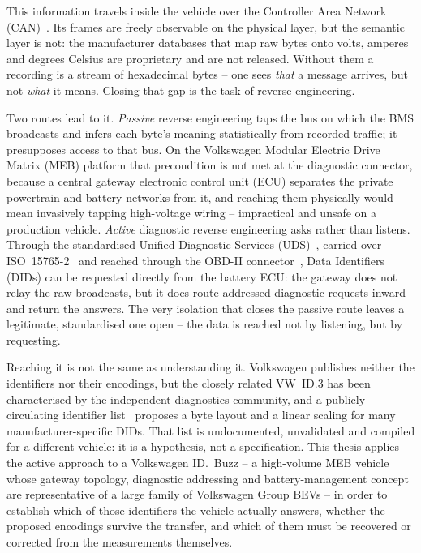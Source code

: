 \documentclass[11pt,a4paper,oneside,parskip=half]{scrreprt}
\begin{document}
This information travels inside the vehicle over the Controller Area Network (CAN)~\cite{iso11898}. Its frames are freely observable on the physical layer, but the semantic layer is not: the manufacturer databases that map raw bytes onto volts, amperes and degrees Celsius are proprietary and are not released. Without them a recording is a stream of hexadecimal bytes -- one sees \emph{that} a message arrives, but not \emph{what} it means. Closing that gap is the task of reverse engineering.

Two routes lead to it. \textit{Passive} reverse engineering taps the bus on which the BMS broadcasts and infers each byte's meaning statistically from recorded traffic; it presupposes access to that bus. On the Volkswagen Modular Electric Drive Matrix (MEB) platform that precondition is not met at the diagnostic connector, because a central gateway electronic control unit (ECU) separates the private powertrain and battery networks from it, and reaching them physically would mean invasively tapping high-voltage wiring -- impractical and unsafe on a production vehicle. \textit{Active} diagnostic reverse engineering asks rather than listens. Through the standardised Unified Diagnostic Services (UDS)~\cite{iso14229}, carried over ISO~15765-2~\cite{iso15765} and reached through the OBD-II connector~\cite{saej1962}, Data Identifiers (DIDs) can be requested directly from the battery ECU: the gateway does not relay the raw broadcasts, but it does route addressed diagnostic requests inward and return the answers. The very isolation that closes the passive route leaves a legitimate, standardised one open -- the data is reached not by listening, but by requesting.

Reaching it is not the same as understanding it. Volkswagen publishes neither the identifiers nor their encodings, but the closely related VW~ID.3 has been characterised by the independent diagnostics community, and a publicly circulating identifier list~\cite{vwmebpidlist} proposes a byte layout and a linear scaling for many manufacturer-specific DIDs. That list is undocumented, unvalidated and compiled for a different vehicle: it is a hypothesis, not a specification. This thesis applies the active approach to a Volkswagen ID.~Buzz -- a high-volume MEB vehicle whose gateway topology, diagnostic addressing and battery-management concept are representative of a large family of Volkswagen Group BEVs -- in order to establish which of those identifiers the vehicle actually answers, whether the proposed encodings survive the transfer, and which of them must be recovered or corrected from the measurements themselves.
\end{document}
